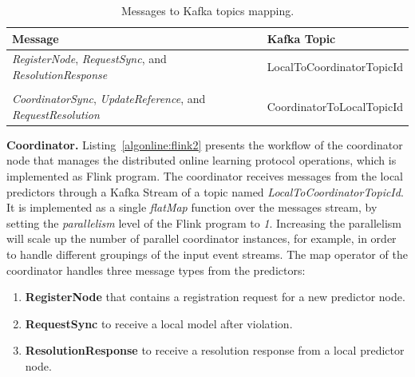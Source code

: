 
\begin{center}
\centering
\begin{table}[h]
	\caption{Messages to Kafka topics mapping.}
	\label{tab:messagesToTopics}
	\begin{tabular}{p{8cm}l}
		\toprule
		Message &Kafka Topic\\
		\midrule
		\parbox[t]{8cm}{\textit{RegisterNode}, \textit{RequestSync},  and \textit{ResolutionResponse} } & LocalToCoordinatorTopicId\\ \\
		
			  \parbox[t]{8cm}{\textit{CoordinatorSync}, \textit{UpdateReference}, and \\ \textit{RequestResolution}} & CoordinatorToLocalTopicId\\
		\bottomrule
	\end{tabular}
\end{table}

\end{center}

\textbf{Coordinator.} Listing~\ref{algonline:flink2} presents the workflow of the coordinator node that manages the distributed online learning protocol operations, which is implemented as Flink program. The coordinator receives messages from the local predictors through a Kafka Stream of a topic named \textit{LocalToCoordinatorTopicId}. It is implemented as a single \textit{flatMap} function over the messages stream, by setting the \textit{parallelism} level of the Flink program to \textit{1}. Increasing the parallelism will scale up the number of parallel coordinator instances, for example, in order to handle different groupings of the input event streams. The map operator of the coordinator  handles three message types from the predictors: \begin{enumerate}[]
	\item \textbf{RegisterNode} that contains  a registration request for a new predictor node.
	\item \textbf{RequestSync} to receive a local model after violation.
	\item \textbf{ResolutionResponse} to receive a resolution response from a local predictor node.  
\end{enumerate}  

